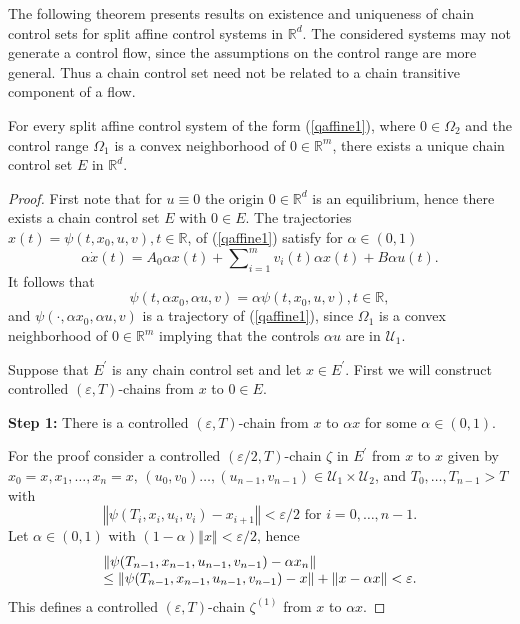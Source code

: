 	The following theorem presents results on existence and uniqueness of chain
	control sets for split affine control systems in $\mathbb{R}^{d}$. The
	considered systems may not generate a control flow, since the assumptions on
	the control range are more general. Thus a chain control set need not be
	related to a chain transitive component of a flow.
	
	\begin{theorem}
		\label{Theorem_unique}For every split affine control system of the form
		(\ref{qaffine1}), where $0\in\Omega_{2}$ and the control range $\Omega_{1}$ is
		a convex neighborhood of $0\in\mathbb{R}^{m}$, there exists a unique chain
		control set $E$ in $\mathbb{R}^{d}$.
	\end{theorem}
	
	\begin{proof}
		First note that for $u\equiv0$ the origin $0\in\mathbb{R}^{d}$ is an
		equilibrium, hence there exists a chain control set $E$ with $0\in E$. The
		trajectories $x(t)=\psi(t,x_{0},u,v),t\in\mathbb{R}$, of (\ref{qaffine1})
		satisfy for $\alpha\in(0,1)$
		\[
		\alpha\dot{x}(t)=A_{0}\alpha x(t)+\sum\nolimits_{i=1}^{m}v_{i}(t)\alpha
		x(t)+B\alpha u(t).
		\]
		It follows that
		\begin{equation}
			\psi(t,\alpha x_{0},\alpha u,v)=\alpha\psi(t,x_{0},u,v),t\in\mathbb{R},
			\label{alpha}%
		\end{equation}
		and $\psi(\cdot,\alpha x_{0},\alpha u,v)$ is a trajectory of (\ref{qaffine1}),
		since $\Omega_{1}$ is a convex neighborhood of $0\in\mathbb{R}^{m}$ implying
		that the controls $\alpha u$ are in $\mathcal{U}_{1}$.
		
		Suppose that $E^{\prime}$ is any chain control set and let $x\in E^{\prime}$.
		First we will construct controlled $(\varepsilon,T)$-chains from $x$ to $0\in
		E$.
		
		\textbf{Step 1:} There is a controlled $(\varepsilon,T)$-chain from $x$ to
		$\alpha x$ for some $\alpha\in(0,1)$.
		
		For the proof consider a controlled $(\varepsilon/2,T)$-chain $\zeta$ in
		$E^{\prime}$ from $x$ to $x$ given by $x_{0}=x,x_{1},\ldots,x_{n}
		=x,\,(u_{0},v_{0})\ldots,(u_{n-1},v_{n-1})\in\mathcal{U}_{1}\times
		\mathcal{U}_{2}$, and $T_{0},\ldots,T_{n-1}>T$ with
		\[
		\left\Vert \psi(T_{i},x_{i},u_{i},v_{i})-x_{i+1}\right\Vert <\varepsilon
		/2\mbox{ for }i=0,\ldots,n-1.
		\]
		Let $\alpha\in(0,1)$ with $(1-\alpha)\left\Vert x\right\Vert <\varepsilon/2$,
		hence
		\[%
		\begin{array}
			[c]{l}%
			\left\Vert \psi(T_{n-1},x_{n-1},u_{n-1},v_{n-1})-\alpha x_{n}\right\Vert \\
			\leq\left\Vert \psi(T_{n-1},x_{n-1},u_{n-1},v_{n-1})-x\right\Vert +\left\Vert
			x-\alpha x\right\Vert <\varepsilon.
		\end{array}
		\]
		This defines a controlled $(\varepsilon,T)$-chain $\zeta^{(1)}$ from $x$ to
		$\alpha x$.
		

\end{proof}
